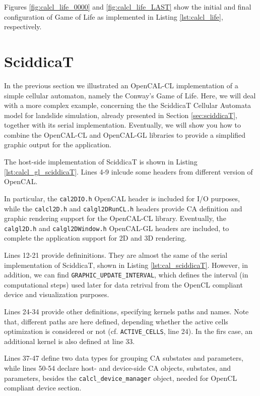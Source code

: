 Figures \ref{fig:calcl_life_0000} and \ref{fig:calcl_life_LAST} show the initial
and final configuration of Game of Life as implemented in Listing
\ref{lst:calcl_life}, respectively. 


\section{SciddicaT}\label{sec:calcl_sciddicaT}
In the previous section we illustrated an OpenCAL-CL implementation of
a simple cellular automaton, namely the Conway’s Game of Life. Here,
we will deal with a more complex example, concerning the the SciddicaT
Cellular Automata model for landslide simulation, already presented in
Section \ref{sec:sciddicaT}, together with its serial
implementation. Eventually, we will show you how to combine the
OpenCAL-CL and OpenCAL-GL libraries to provide a simplified graphic
output for the application.



The host-side implementation of SciddicaT is shown in Listing
\ref{lst:calcl_gl_sciddicaT}. Lines 4-9 inlcude some headers from
different version of OpenCAL.

In particular, the \verb'cal2DIO.h' OpenCAL header is included for
I/O purposes, while the \verb'calcl2D.h' and
\verb'calgl2DRunCL.h' headers provide CA definition and graphic
rendering support for the OpenCAL-CL library. Eventually, the
\verb'calgl2D.h' and \verb'calgl2DWindow.h' OpenCAL-GL headers are
included, to complete the application support for 2D and 3D rendering.

Lines 12-21 provide defininitions. They are almost the same of the
serial implementation of SciddicaT, shown in Listing
\ref{lst:cal_sciddicaT}. However, in addition, we can find
\verb'GRAPHIC_UPDATE_INTERVAL', which defines the interval (in
computational steps) used later for data retrival from the OpenCL
compliant device and visualization purposes.

Lines 24-34 provide other definitions, specifying kernels paths and
names. Note that, different paths are here defined, depending whether
the active cells optimization is considered or not
(cf. \verb'ACTIVE_CELLS', line 24). In the firs case, an additional
kernel is also defined at line 33.

Lines 37-47 define two data types for grouping CA substates and
parameters, while lines 50-54 declare host- and device-side CA
objects, substates, and parameters, besides the
\verb'calcl_device_manager' object, needed for OpenCL compliant device
section.

